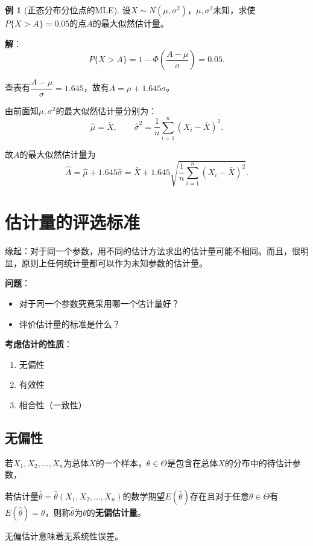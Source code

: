 \documentclass[11pt,a4paper]{report}
\theoremstyle{definition}
\newtheorem{example}{例}[chapter]
\begin{document}
\begin{example}[正态分布分位点的MLE]
设$X\sim N(\mu,\sigma^{2})$，$\mu,\sigma^{2}$未知，求使$P\{X>A\}=0.05$的点$A$的最大似然估计量。

\textbf{解}：
\[
P\{X>A\}=1-\Phi\left(\frac{A-\mu}{\sigma}\right)=0.05.
\]

查表有$\dfrac{A-\mu}{\sigma}=1.645$，故有$A=\mu+1.645\sigma$。

由前面知$\mu,\sigma^{2}$的最大似然估计量分别为：
\[
\hat{\mu}=\bar{X},\qquad \hat{\sigma}^{2}=\frac{1}{n}\sum_{i=1}^{n}(X_{i}-\bar{X})^{2}.
\]

故$A$的最大似然估计量为
\[
\hat{A}=\hat{\mu}+1.645\hat{\sigma}=\bar{X}+1.645\sqrt{\frac{1}{n}\sum_{i=1}^{n}(X_{i}-\bar{X})^{2}}.
\]
\end{example}

\section{估计量的评选标准}

缘起：对于同一个参数，用不同的估计方法求出的估计量可能不相同。而且，很明显，原则上任何统计量都可以作为未知参数的估计量。

\textbf{问题}：
\begin{itemize}[leftmargin=2em]
    \item 对于同一个参数究竟采用哪一个估计量好？
    \item 评价估计量的标准是什么？
\end{itemize}

\textbf{考虑估计的性质}：
\begin{enumerate}[label=(\arabic*),leftmargin=2em]
    \item 无偏性
    \item 有效性
    \item 相合性（一致性）
\end{enumerate}

\subsection{无偏性}

若$X_{1},X_{2},\ldots,X_{n}$为总体$X$的一个样本，$\theta\in\Theta$是包含在总体$X$的分布中的待估计参数，

若估计量$\hat{\theta}=\hat{\theta}(X_{1},X_{2},\ldots,X_{n})$的数学期望$E(\hat{\theta})$存在且对于任意$\theta\in\Theta$有$E(\hat{\theta})=\theta$，则称$\hat{\theta}$为$\theta$的\textbf{无偏估计量}。

无偏估计意味着无系统性误差。
\end{document}
